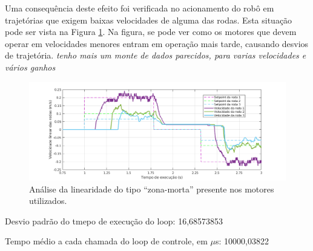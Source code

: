 Uma consequência deste efeito foi verificada no acionamento do robô em trajetórias que exigem baixas velocidades de alguma das rodas. Esta situação pode ser vista na Figura \ref{fig:zm3rodas}. Na figura, se pode ver como os motores que devem operar em velocidades menores entram em operação mais tarde, causando desvios de trajetória. \textit{tenho mais um monte de dados parecidos, para varias velocidades e vários ganhos}

\begin{figure}[h]
  \centering
  \includegraphics[width = \textwidth]{imagens/zm3rodas}
  \caption{Análise da linearidade do tipo ``zona-morta'' presente nos motores utilizados.}
  \label{fig:zm3rodas}
\end{figure}

Desvio padrão do tmepo de execução do loop: 16,68573853

Tempo médio a cada chamada do loop de controle, em $\mu$s: 10000,03822
